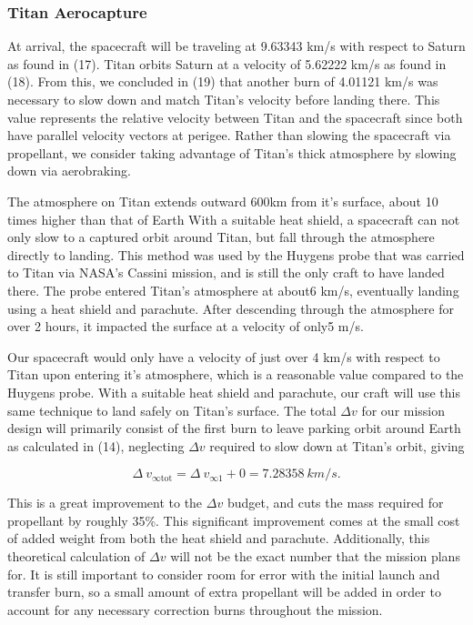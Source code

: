 \documentclass[conf]{new-aiaa}
\begin{document}
\subsubsection{Titan Aerocapture}

At arrival, the spacecraft will be traveling at 9.63343 km/s with respect to Saturn as found in (17). Titan orbits Saturn at a velocity of 5.62222 km/s as found in (18). From this, we concluded in (19) that another burn of 4.01121 km/s was necessary to slow down and match Titan's velocity before landing there. This value represents the relative velocity between Titan and the spacecraft since both have parallel velocity vectors at perigee. Rather than slowing the spacecraft via propellant, we consider taking advantage of Titan's thick atmosphere by slowing down via aerobraking.\par

The atmosphere on Titan extends outward 600km from it's surface, about 10 times higher than that of Earth\cite{NASA} With a suitable heat shield, a spacecraft can not only slow to a captured orbit around Titan, but fall through the atmosphere directly to landing. This method was used by the Huygens probe that was carried to Titan via NASA's Cassini mission, and is still the only craft to have landed there. The probe entered Titan's atmosphere at about\cite{Springer}{6 km/s}, eventually landing using a heat shield and parachute. After descending through the atmosphere for over 2 hours, it impacted the surface at a velocity of only{5 m/s}\cite{Educational}. \par

Our spacecraft would only have a velocity of just over 4 km/s with respect to Titan upon entering it's atmosphere, which is a reasonable value compared to the Huygens probe. With a suitable heat shield and parachute, our craft will use this same technique to land safely on Titan's surface. The total $\Delta v$ for our mission design will primarily consist of the first burn to leave parking orbit around Earth as calculated in (14), neglecting $\Delta v$ required to slow down at Titan's orbit, giving

\begin{equation}
\Delta \!\ v_{\infty \text{tot}} = \Delta \!\ v_{\infty 1} + 0 = 7.28358 \ km/s.
\end{equation}

This is a great improvement to the $\Delta v$ budget, and cuts the mass required for propellant by roughly 35\%. This significant improvement comes at the small cost of added weight from both the heat shield and parachute. Additionally, this theoretical calculation of $\Delta v$ will not be the exact number that the mission plans for. It is still important to consider room for error with the initial launch and transfer burn, so a small amount of extra propellant will be added in order to account for any necessary correction burns throughout the mission. 
\end{document}
